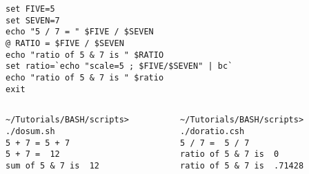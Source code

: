\documentclass[slidestop,mathserif,compress,xcolor=svgnames]{beamer}
\newenvironment{eblock}[0]
{
\begin{beamerboxesrounded}[upper=uppercol2,lower=lowercol2,shadow=true]}
{\end{beamerboxesrounded}}
\begin{document}
\begin{frame}
{\begin{columns}
\begin{block}{}
\begin{verbatim}
set FIVE=5
set SEVEN=7
echo "5 / 7 = " $FIVE / $SEVEN
@ RATIO = $FIVE / $SEVEN
echo "ratio of 5 & 7 is " $RATIO
set ratio=`echo "scale=5 ; $FIVE/$SEVEN" | bc`
echo "ratio of 5 & 7 is " $ratio
exit
      \end{verbatim}
      \end{block}
    \end{columns}
    \begin{columns}
      \vspace{0.2cm}
      \begin{eblock}{}
      \begin{verbatim}
~/Tutorials/BASH/scripts> ./dosum.sh 
5 + 7 = 5 + 7
5 + 7 =  12
sum of 5 & 7 is  12
      \end{verbatim}
      \end{eblock}
      \begin{block}{}
      \begin{verbatim}
~/Tutorials/BASH/scripts> ./doratio.csh 
5 / 7 =  5 / 7
ratio of 5 & 7 is  0
ratio of 5 & 7 is  .71428
      \end{verbatim}
      \end{block}
    \end{columns}
  }
\end{frame}


%
\end{document}
